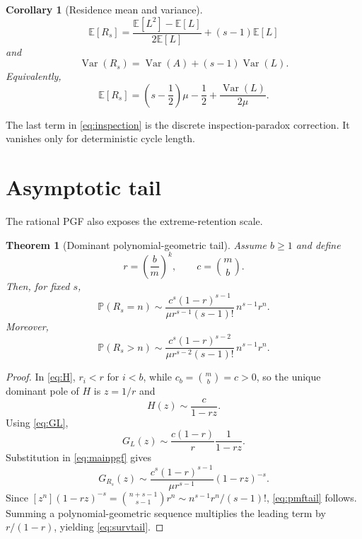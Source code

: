 \documentclass[11pt]{article}
\newtheorem{theorem}{Theorem}
\newtheorem{corollary}{Corollary}
\newcommand{\E}{\mathbb{E}}
\newcommand{\Prb}{\mathbb{P}}
\begin{document}
\begin{corollary}[Residence mean and variance]
\begin{equation}
\boxed{
\E[R_s]
=\frac{\E[L^2]-\E[L]}{2\E[L]}+(s-1)\E[L]
}
\label{eq:meanR}
\end{equation}
and
\begin{equation}
\boxed{
\operatorname{Var}(R_s)
=\operatorname{Var}(A)+(s-1)\operatorname{Var}(L).
}
\label{eq:varR}
\end{equation}
Equivalently,
\begin{equation}
\E[R_s]
=\left(s-\frac12\right)\mu-\frac12
+\frac{\operatorname{Var}(L)}{2\mu}.
\label{eq:inspection}
\end{equation}
\end{corollary}

The last term in \eqref{eq:inspection} is the discrete inspection-paradox correction. It vanishes only for deterministic cycle length.

\section{Asymptotic tail}
The rational PGF also exposes the extreme-retention scale.

\begin{theorem}[Dominant polynomial-geometric tail]
Assume $b\ge1$ and define
\[
r=\left(\frac bm\right)^k,
\qquad
c=\binom mb.
\]
Then, for fixed $s$,
\begin{equation}
\boxed{
\Prb(R_s=n)
\sim
\frac{c^s(1-r)^{s-1}}
{\mu r^{s-1}(s-1)!}
\,n^{s-1}r^n.
}
\label{eq:pmftail}
\end{equation}
Moreover,
\begin{equation}
\boxed{
\Prb(R_s>n)
\sim
\frac{c^s(1-r)^{s-2}}
{\mu r^{s-2}(s-1)!}
\,n^{s-1}r^n.
}
\label{eq:survtail}
\end{equation}
\end{theorem}

\begin{proof}
In \eqref{eq:H}, $r_i<r$ for $i<b$, while $c_b=\binom mb=c>0$, so the unique dominant pole of $H$ is $z=1/r$ and
\[
H(z)\sim \frac{c}{1-rz}.
\]
Using \eqref{eq:GL},
\[
G_L(z)\sim
\frac{c(1-r)}{r}\frac1{1-rz}.
\]
Substitution in \eqref{eq:mainpgf} gives
\[
G_{R_s}(z)
\sim
\frac{c^s(1-r)^{s-1}}{\mu r^{s-1}}(1-rz)^{-s}.
\]
Since
$[z^n](1-rz)^{-s}=\binom{n+s-1}{s-1}r^n
\sim n^{s-1}r^n/(s-1)!$,
\eqref{eq:pmftail} follows. Summing a polynomial-geometric sequence multiplies the leading term by $r/(1-r)$, yielding \eqref{eq:survtail}.
\end{proof}
\end{document}
